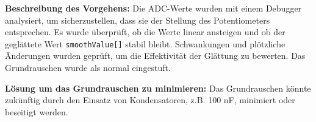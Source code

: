 \textbf{Beschreibung des Vorgehens:}
Die ADC-Werte wurden mit einem Debugger analysiert, um sicherzustellen, dass sie der Stellung des Potentiometers entsprechen. Es wurde überprüft, ob die Werte linear ansteigen und ob der geglättete Wert \texttt{smoothValue[]} stabil bleibt. Schwankungen und plötzliche Änderungen wurden geprüft, um die Effektivität der Glättung zu bewerten. Das Grundrauschen wurde als normal eingestuft.

\textbf{Lösung um das Grundrauschen zu minimieren:}
Das Grundrauschen könnte zukünftig durch den Einsatz von Kondensatoren, z.B. 100 nF, minimiert oder beseitigt werden.